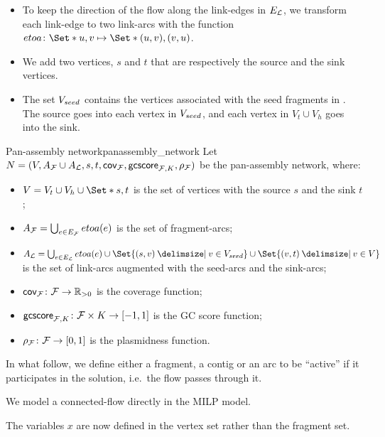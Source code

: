 \begin{itemize}
  \item To keep the direction of the flow along the link-edges in \(E_{\mathcal{L}}{}\), we transform each link-edge to two link-arcs with the function \(etoa \colon \Set*{u, v} \mapsto \Set*{(u, v), (v, u)}\).
  \item We add two vertices, \(s\) and \(t\) that are respectively the source and the sink vertices.
  \item The set \(V_{seed}{}\) contains the vertices associated with the seed fragments in \SeedFrags{}.
    The source goes into each vertex in \(V_{seed}{}\), and each vertex in \(V_t \cup V_h\) goes into the sink.
\end{itemize}

\begin{definition}{Pan-assembly network}{panassembly_network}
  Let \(N = (V, A_{\mathcal{F}}{} \cup A_{\mathcal{L}}{}, s, t, \mathsf{cov}_{\mathcal{F}{}}, \mathsf{gcscore}_{\mathcal{F}{}, K}, \rho_{\mathcal{F}{}})\) be the pan-assembly network, where:

  \begin{itemize}
    \item \(V = V_t \cup V_h \cup \Set*{s, t}\) is the set of vertices with the source \(s\) and the sink \(t\);
    \item \(A_{\mathcal{F}}{} = \bigcup_{e \in E_{\mathcal{F}}{}} etoa(e)\) is the set of fragment-arcs;
    \item \(A_\Links{} = \bigcup_{e \in E_\Links{}} etoa(e) \cup \Set{(s, v) \given v \in \VSeed{}} \cup \Set{(v, t) \given v \in V}\) is the set of link-arcs augmented with the seed-arcs and the sink-arcs;
    \item \(\mathsf{cov}_{\mathcal{F}{}} \colon \mathcal{F}{} \to \mathbb{R}{}_{> 0}\) is the coverage function;
    \item \(\mathsf{gcscore}_{\mathcal{F}{}, K} \colon \mathcal{F}{} \times K \to [-1, 1]\) is the GC score function;
    \item \(\rho_{\mathcal{F}{}} \colon \mathcal{F}{} \to [0, 1]\) is the plasmidness function.
  \end{itemize}
\end{definition}

In what follow, we define either a fragment, a contig or an arc to be \enquote{active} if it participates in the solution, i.e.\ the flow passes through it.

\begin{newfeatbox}
  We model a connected-flow directly in the MILP model.

  \begin{notebox}
    The variables \(x\) are now defined in the vertex set rather than the fragment set.
  \end{notebox}
\end{newfeatbox}

